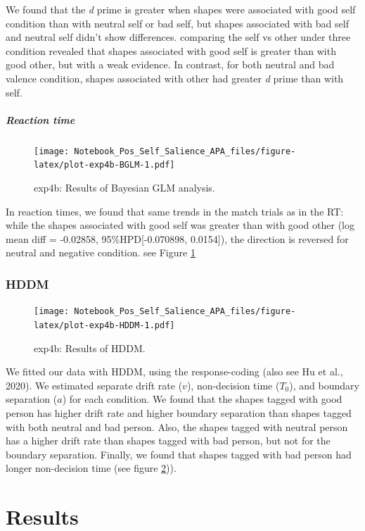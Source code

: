 \documentclass[
  english,
  man]{apa6}
\let\oldsubparagraph\subparagraph
\renewcommand{\subparagraph}[1]{\oldsubparagraph{#1}\mbox{}}
\begin{document}
We found that the \emph{d} prime is greater when shapes were associated with good self condition than with neutral self or bad self, but shapes associated with bad self and neutral self didn't show differences. comparing the self vs other under three condition revealed that shapes associated with good self is greater than with good other, but with a weak evidence. In contrast, for both neutral and bad valence condition, shapes associated with other had greater \emph{d} prime than with self.

\hypertarget{reaction-time-13}{%
\subparagraph{Reaction time}\label{reaction-time-13}}

\begin{figure}
\centering
\texttt{[image: Notebook\_Pos\_Self\_Salience\_APA\_files/figure-latex/plot-exp4b-BGLM-1.pdf]}
\caption{\label{fig:plot-exp4b-BGLM}exp4b: Results of Bayesian GLM analysis.}
\end{figure}

In reaction times, we found that same trends in the match trials as in the RT: while the shapes associated with good self was greater than with good other (log mean diff = -0.02858, 95\%HPD{[}-0.070898, 0.0154{]}), the direction is reversed for neutral and negative condition. see Figure \ref{fig:plot-exp4b-BGLM}

\hypertarget{hddm-9}{%
\subsubsection{HDDM}\label{hddm-9}}

\begin{figure}
\centering
\texttt{[image: Notebook\_Pos\_Self\_Salience\_APA\_files/figure-latex/plot-exp4b-HDDM-1.pdf]}
\caption{\label{fig:plot-exp4b-HDDM}exp4b: Results of HDDM.}
\end{figure}

We fitted our data with HDDM, using the response-coding (also see Hu et al., 2020). We estimated separate drift rate (\(v\)), non-decision time (\(T_{0}\)), and boundary separation (\(a\)) for each condition. We found that the shapes tagged with good person has higher drift rate and higher boundary separation than shapes tagged with both neutral and bad person. Also, the shapes tagged with neutral person has a higher drift rate than shapes tagged with bad person, but not for the boundary separation. Finally, we found that shapes tagged with bad person had longer non-decision time (see figure \ref{fig:plot-exp4b-HDDM})).

\hypertarget{results-9}{%
\section{Results}\label{results-9}}
\end{document}
